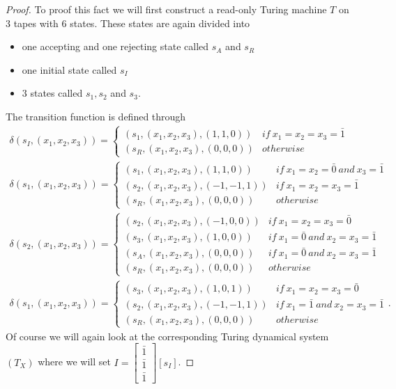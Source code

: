 \documentclass[12pt,a4paper]{scrartcl}
\numberwithin{equation}{section}
\newcommand{\2}{\mathbb{Z} / 2 \mathbb{Z}}
\newcommand{\1}{\bar{1}}
\newcommand{\0}{\bar{0}}
\begin{document}
\begin{proof}
	To proof this fact we will first construct a read-only Turing machine $T$ on $3$ tapes with $6$ states. These states are again divided into
	\begin{itemize}
		\item one accepting and one rejecting state called $s_A$ and $s_R$
		\item one initial state called $s_I$
		\item $3$ states called $s_1, s_2$ and $s_3$.
	\end{itemize}
	The transition function is defined through
	\begin{align*}
		\delta(s_I, (x_1, x_2, x_3)) = \begin{cases}
			(s_1, (x_1, x_2, x_3), (1, 1, 0)) & if \ x_1 = x_2 = x_3 = \1 \\
			(s_R, (x_1, x_2, x_3), (0, 0, 0)) & otherwise
		\end{cases} \\
		\delta(s_1, (x_1, x_2, x_3)) = \begin{cases}
		(s_1, (x_1, x_2, x_3), (1, 1, 0)) & if \ x_1 = x_2 = \0 \ and \ x_3 = \1 \\
		(s_2, (x_1, x_2, x_3), (-1, -1, 1)) & if \ x_1 = x_2 = x_3 = \1 \\
		(s_R, (x_1, x_2, x_3), (0, 0, 0)) & otherwise
		\end{cases} \\
		\delta(s_2, (x_1, x_2, x_3)) = \begin{cases}
		(s_2, (x_1, x_2, x_3), (-1, 0, 0)) & if \ x_1 = x_2 = x_3 = \0  \\
		(s_3, (x_1, x_2, x_3), (1, 0, 0)) & if \ x_1 = \0 \ and \ x_2 = x_3 = \1 \\
		(s_A, (x_1, x_2, x_3), (0, 0, 0)) & if \ x_1 = \0 \ and \ x_2 = x_3 = \1  \\ 
		(s_R, (x_1, x_2, x_3), (0, 0, 0)) & otherwise
		\end{cases} \\
		\delta(s_1, (x_1, x_2, x_3)) = \begin{cases}
		(s_3, (x_1, x_2, x_3), (1, 0, 1)) & if \ x_1 = x_2 = x_3 = \0 \\
		(s_2, (x_1, x_2, x_3), (-1, -1, 1)) & if \ x_1 = \1 \ and \ x_2 = x_3 = \1 \\
		(s_R, (x_1, x_2, x_3), (0, 0, 0)) & otherwise
		\end{cases}.
	\end{align*}
	Of course we will again look at the corresponding Turing dynamical system $(T_X)$ where we will set $I = \begin{bmatrix}
	\1 \\
	\1 \\
	\1 
	\end{bmatrix}[s_I]$.
	

\end{proof}
\end{document}
